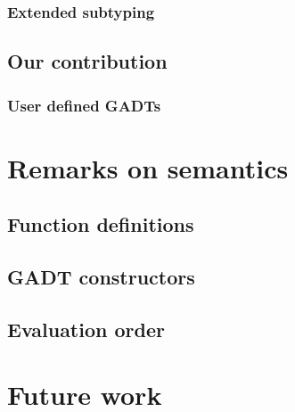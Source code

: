 \documentclass[declaration,shortabstract,english]{iithesis}
\begin{document}
\subsection*{Extended subtyping}

\section{Our contribution}
\subsection*{User defined GADTs}

\chapter{Remarks on semantics}
\section{Function definitions}
\section{GADT constructors}
\section{Evaluation order}

\chapter{Future work}




\end{document}
